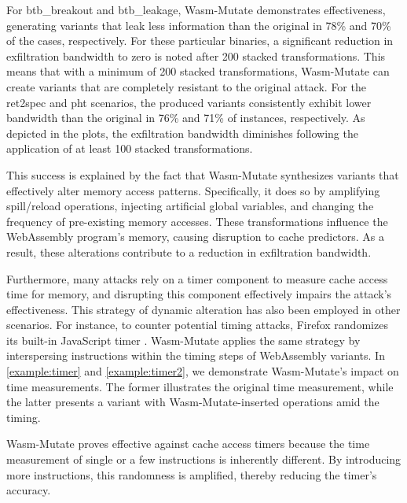 \documentclass[a4paper,fleqn]{cas-dc}
\newcommand{\tool}{{\sc Wasm-Mutate}\xspace}
\newcommand{\Wasm}{WebAssembly\xspace}
\newcommand{\wasm}{\Wasm}
\begin{document}
For btb\_breakout and btb\_leakage, \tool demonstrates effectiveness, generating variants that leak less information than the original in 78\% and 70\% of the cases, respectively.
For these particular binaries, a significant reduction in exfiltration bandwidth to zero is noted after 200 stacked transformations.
This means that with a minimum of 200 stacked transformations, \tool can create variants that are completely resistant to the original attack.
For the ret2spec and pht scenarios, the produced variants consistently exhibit lower bandwidth than the original in 76\% and 71\% of instances, respectively.
As depicted in the plots, the exfiltration bandwidth diminishes following the application of at least  100 stacked transformations.

This success is explained by the fact that \tool synthesizes variants that effectively alter memory access patterns. 
Specifically, it does so by amplifying spill/reload operations, injecting artificial global variables, and changing the frequency of pre-existing memory accesses. 
These transformations influence the \wasm program's memory, causing disruption to cache predictors. 
As a result, these alterations contribute to a reduction in exfiltration bandwidth.

Furthermore, many attacks rely on a timer component to measure cache access time for memory, and disrupting this component  effectively impairs the attack's effectiveness. 
This strategy of dynamic alteration has also been  employed in other scenarios. 
For instance, to counter potential timing attacks, Firefox randomizes its built-in JavaScript timer \cite{10.1007/978-3-319-70972-7_13}. \tool applies the same strategy by interspersing instructions within the timing steps of \wasm variants. 
In \autoref{example:timer} and \autoref{example:timer2}, we demonstrate \tool's impact on time measurements. 
The former illustrates the original time measurement, while the latter presents a variant with \tool-inserted operations amid the timing.



\tool proves effective against cache access timers because the time measurement of single or a few instructions is inherently different. 
By introducing more instructions, this randomness is amplified, thereby reducing the timer's accuracy.
\end{document}
